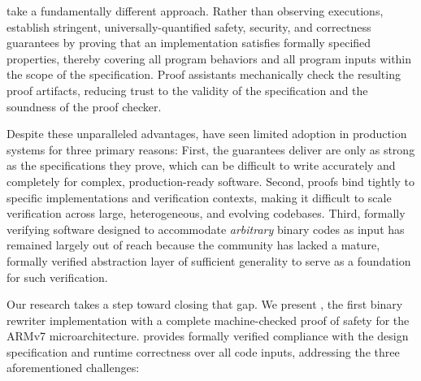 \FMs take a fundamentally different approach. Rather than observing executions, \FMs establish stringent, univer\-sally-quantified safety, security, and correctness guarantees by proving that an implementation satisfies formally specified properties, thereby covering all program behaviors and all program inputs within the scope of the specification. Proof assistants mechanically check the resulting proof artifacts, reducing trust to the validity of the specification and the soundness of the proof checker.

Despite these unparalleled advantages, \FMs have seen limited adoption in production systems for three primary reasons:
%
First, the guarantees \FMs deliver are only as strong as the specifications they prove, which can be difficult to write accurately and completely for complex, production-ready software.
Second, proofs bind tightly to specific implementations and verification contexts, making it difficult to scale verification across large, heterogeneous, and evolving codebases.
Third, formally verifying software designed to accommodate \emph{arbitrary} binary codes as input has remained largely out of reach because the community has lacked a mature, formally verified abstraction layer of sufficient generality to serve as a foundation for such verification.


Our research takes a step toward closing that gap.
We present \pname, the first binary \cfi rewriter implementation with a complete machine-checked proof of safety for the ARMv7 microarchitecture.
\pname provides formally verified compliance with the design specification and runtime correctness over all code inputs, addressing the three aforementioned challenges:

